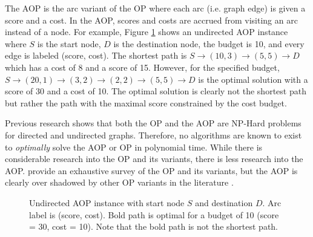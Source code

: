 \documentclass[11pt]{article}
\begin{document}
The AOP is the arc variant of the OP where each arc (i.e. graph edge) is given a score and a cost. In the AOP, scores and costs are accrued from visiting an arc instead of a node. For example, Figure \ref{fig:aop-example} shows an undirected AOP instance where $S$ is the start node, $D$ is the destination node, the budget is 10, and every edge is labeled (score, cost). The shortest path is $S \rightarrow (10,3) \rightarrow (5,5) \rightarrow D$ which has a cost of 8 and a score of 15. However, for the specified budget, $S \rightarrow (20,1) \rightarrow (3,2) \rightarrow (2,2) \rightarrow (5,5) \rightarrow D$ is the optimal solution with a score of 30 and a cost of 10. The optimal solution is clearly not the shortest path but rather the path with the maximal score constrained by the cost budget.

Previous research shows that both the OP and the AOP are NP-Hard problems for directed and undirected graphs. Therefore, no algorithms are known to exist to \emph{optimally} solve the AOP or OP in polynomial time. While there is considerable research into the OP and its variants, there is less research into the AOP. \citeauthor{gunawan2016orienteering} provide an exhaustive survey of the OP and its variants, but the AOP is clearly over shadowed by other OP variants in the literature \cite{gunawan2016orienteering}.

\begin{figure}[h]
\begin{center}
\end{center}
\caption{Undirected AOP instance with start node $S$ and destination $D$. Arc label is (score, cost). Bold path is optimal for a budget of 10 (score = 30, cost = 10). Note that the bold path is not the shortest path.\label{fig:aop-example}}
\end{figure}
\end{document}
